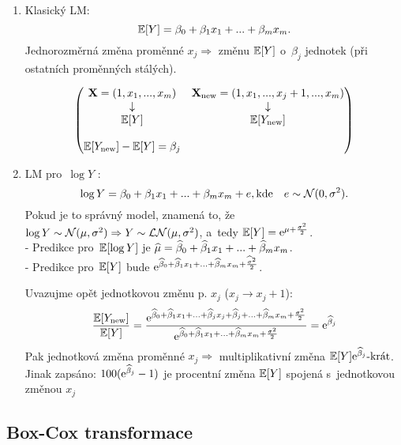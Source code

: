 \begin{enumerate}
\item Klasický LM:
 $$
 \mathbb{E} [Y] = \beta_0 + \beta_1 x_1 +... + \beta_m x_m.
 $$
Jednorozměrná změna proměnné $x_j \Rightarrow$ změnu $\mathbb{E} [Y]$ o~$\beta_j$ jednotek (při ostatních proměnných stálých).

 $$
\left(\begin{matrix}
\textbf{X} = (1,x_1,...,x_m) & \textbf{X}_{\text{new}} = (1,x_1,...,x_j+1,...,x_m) \\
\downarrow &  \downarrow \\
\mathbb{E} [Y] & \mathbb{E} [Y_{\text{new}}] \\
 & \\
 \mathbb{E} [Y_{\text{new}}] - \mathbb{E} [Y] = \beta_j &
\end{matrix} \right)
 $$
\item LM pro~$\log Y$ :
 $$
 \log Y = \beta_0 + \beta_1 x_1 +... + \beta_m x_m + e, \text{kde} \quad e \sim \mathcal{N}(0,\sigma^2).
 $$
Pokud je to správný model, znamená to, že $\log Y \sim \mathcal{N}(\mu,\sigma^2) \Rightarrow Y \sim \mathcal{LN}(\mu,\sigma^2)$, a~tedy $\mathbb{E}[Y] = \mathrm{e}^{\mu + \frac{\sigma^2}{2}}$. \\
- Predikce pro~$\mathbb{E} [\log Y]$ je $\widehat{\mu} = \widehat{\beta}_0 + \widehat{\beta}_1 x_1 +... + \widehat{\beta}_m x_m$. \\
- Predikce pro~$\mathbb{E} [Y]$ bude $\mathrm{e}^{\widehat{\beta}_0 + \widehat{\beta}_1 x_1 +... + \widehat{\beta}_m x_m + \frac{\widehat{\sigma}^2}{2}}$.

Uvazujme opět jednotkovou změnu p. $x_j$ ($x_j \rightarrow x_j + 1$):
 $$
\frac{ \mathbb{E} [Y_{\text{new}}]}{\mathbb{E} [Y]} = \frac{\mathrm{e}^{\widehat{\beta}_0 + \widehat{\beta}_1 x_1 +... + \widehat{\beta}_j x_j + \widehat{\beta}_j +... + \widehat{\beta}_m x_m + \frac{\sigma^2}{2}}}{\mathrm{e}^{\widehat{\beta}_0 + \widehat{\beta}_1 x_1 +... + \widehat{\beta}_m x_m + \frac{\sigma^2}{2}}} = \mathrm{e}^{\widehat{\beta}_j}
 $$
Pak jednotková změna proměnné $x_j \Rightarrow$ multiplikativní změna $\mathbb{E} [Y] \mathrm{e}^{\widehat{\beta}_j}\text{-krát}$. Jinak zapsáno: $100(\mathrm{e}^{\widehat{\beta}_j}-1)$ je procentní změna $\mathbb{E} [Y]$ spojená s~jednotkovou změnou $x_j$
\end{enumerate}\subsection{Box-Cox transformace}
